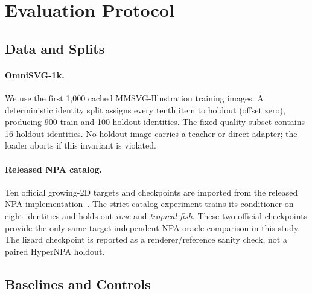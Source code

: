\documentclass[sigconf,nonacm]{acmart}
\begin{document}
\section{Evaluation Protocol}

\subsection{Data and Splits}

\paragraph{OmniSVG-1k.}
We use the first 1,000 cached MMSVG-Illustration training images. A deterministic
identity split assigns every tenth item to holdout (offset zero), producing 900
train and 100 holdout identities. The fixed quality subset contains 16 holdout
identities. No holdout image carries a teacher or direct adapter; the loader
aborts if this invariant is violated.

\paragraph{Released NPA catalog.}
Ten official growing-2D targets and checkpoints are imported from the released
NPA implementation~\cite{npacode}. The strict catalog experiment trains its
conditioner on eight identities and holds out \emph{rose} and
\emph{tropical fish}. These two official checkpoints provide the only
same-target independent NPA oracle comparison in this study. The lizard
checkpoint is reported as a renderer/reference sanity check, not a paired
HyperNPA holdout.

\subsection{Baselines and Controls}

\begin{table}[t]
\caption{Evaluation hierarchy. ``Train'' rows cannot establish image
generalization.}
\label{tab:evaluation-hierarchy}
\centering
{}
\end{table}
\end{document}
